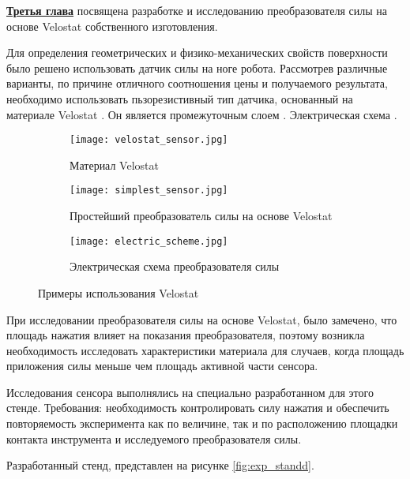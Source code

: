 
\textbf{\underline{Третья глава}} посвящена разработке и исследованию преобразователя силы на основе Velostat собственного изготовления.

Для определения геометрических и физико-механических свойств поверхности было решено использовать датчик силы на ноге робота. Рассмотрев различные варианты, по причине отличного соотношения цены и получаемого результата, необходимо использовать пьзорезистивный тип датчика, основанный на материале Velostat . Он является промежуточным слоем . Электрическая схема . 


\begin{figure}[ht]
    \begin{subfigure}[t]{0.33\textwidth}
        \centering\texttt{[image: velostat\_sensor.jpg]}
        \caption{Материал Velostat}
        \label{fig:velostat_sensor.jpg}
    \end{subfigure}
    \begin{subfigure}[t]{0.33\textwidth}
        \centering\texttt{[image: simplest\_sensor.jpg]}
        \caption{Простейший преобразователь силы на основе Velostat}
        \label{fig:simplest_sensor.jpg}
    \end{subfigure}
    \begin{subfigure}[t]{0.33\textwidth}
        \centering\texttt{[image: electric\_scheme.jpg]}\\
        \caption{Электрическая схема преобразователя силы}
        \label{fig:el_scheme}
    \end{subfigure}
    \caption{Примеры использования Velostat}
\end{figure}

При исследовании преобразователя силы на основе Velostat, было замечено, что площадь нажатия влияет на показания преобразователя, поэтому возникла необходимость исследовать характеристики материала для случаев, когда площадь приложения силы меньше чем площадь активной части сенсора.

Исследования сенсора выполнялись на специально разработанном для этого стенде. Требования: необходимость контролировать силу нажатия и обеспечить повторяемость эксперимента как по величине, так и по расположению площадки контакта инструмента и исследуемого преобразователя силы. 

Разработанный стенд, представлен на рисунке \ref{fig:exp_standd}.

